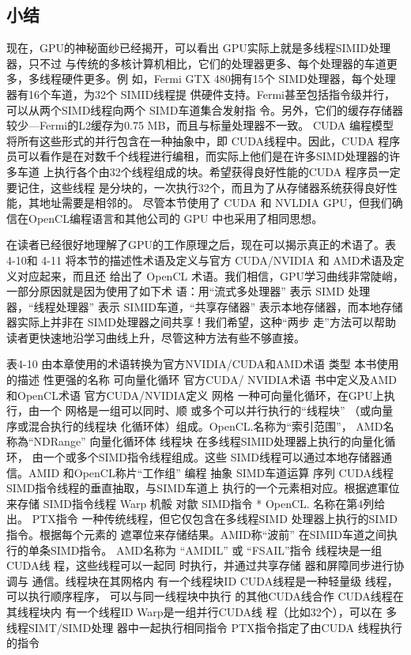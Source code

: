\subsection{小结}
现在，GPU的神秘面纱已经揭开，可以看出 GPU实际上就是多线程SIMID处理器，只不过
与传统的多核计算机相比，它们的处理器更多、每个处理器的车道更多，多线程硬件更多。例
如，Fermi GTX 480拥有15个 SIMD处理器，每个处理器有16个车道，为32个 SIMID线程提
供硬件支持。Fermi甚至包括指令级并行，可以从两个SIMD线程向两个 SIMD车道集合发射指
令。另外，它们的缓存存储器较少—Fermi的L2缓存为0.75 MB，而且与标量处理器不一致。
CUDA 编程模型将所有这些形式的并行包含在一种抽象中，即 CUDA线程中。因此，CUDA
程序员可以看作是在对数千个线程进行编租，而实际上他们是在许多SIMD处理器的许多车道
上执行各个由32个线程组成的块。希望获得良好性能的CUDA 程序员一定要记住，这些线程
是分块的，一次执行32个，而且为了从存储器系统获得良好性能，其地址需要是相邻的。
尽管本节使用了 CUDA 和 NVLDIA GPU，但我们确信在OpenCL编程语言和其他公司的
GPU 中也采用了相同思想。

在读者已经很好地理解了GPU的工作原理之后，现在可以揭示真正的术语了。表4-10和
4-11 将本节的描述性术语及定义与官方 CUDA/NVIDIA 和 AMD术语及定义对应起来，而且还
给出了 OpenCL 术语。我们相信，GPU学习曲线非常陡峭，一部分原因就是因为使用了如下术
语：用“流式多处理器” 表示 SIMD 处理器，“线程处理器” 表示 SIMID车道，“共享存储器”
表示本地存储器，而本地存储器实际上并非在 SIMD处理器之间共享！我们希望，这种“两步
走”方法可以帮助读者更快速地沿学习曲线上升，尽管这种方法有些不够直接。

表4-10 由本章使用的术语转换为官方NVIDIA/CUDA和AMD术语
类型
本书使用的描述
性更强的名称
可向量化循环
官方CUDA/
NVIDIA术语
书中定义及AMD和OpenCL术语
官方CUDA/NVIDIA定义
网格
一种可向量化循环，在GPU上执行，由一个
网格是一组可以同时、顺
或多个可以并行执行的“线程块”
（或向量
序或混合执行的线程块
化循环体）组成。OpenCL.名称为“索引范围”，
AMD名称為“NDRange”
向量化循环体
线程块
在多线程SIMID处理器上执行的向量化循环，
由一个或多个SIMD指令线程组成。这些
SIMD线程可以通过本地存储器通信。AMID
和OpenCL称片“工作组”
编程
抽象
SIMD车道运算
序列
CUDA线程
SIMD指令线程的垂直抽取，与SIMD车道上
执行的一个元素相对应。根据遮軍位来存储
SIMD指令线程
Warp
机骽
对歙
SIMD指令
* OpenCL. 名称在第4列给出。
PTX指令
一种传统线程，但它仅包含在多线程SIMD
处理器上执行的SIMD指令。根据每个元素的
遮罩位来存储结果。AMID称“波前”
在SIMID车道之间执行的单条SIMD指令。
AMD名称为 “AMDIL” 或 “FSAIL”指令
线程块是一组CUDA线
程，这些线程可以一起同
时执行，并通过共享存储
器和屏障同步进行协调与
通信。线程块在其网格内
有一个线程块ID
CUDA线程是一种轻量级
线程，可以执行顺序程序，
可以与同一线程块中执行
的其他CUDA线合作
CUDA线程在其线程块内
有一个线程ID
Warp是一组并行CUDA线
程（比如32个），可以在
多线程SIMT/SIMD处理
器中一起执行相同指令
PTX指令指定了由CUDA
线程执行的指令


